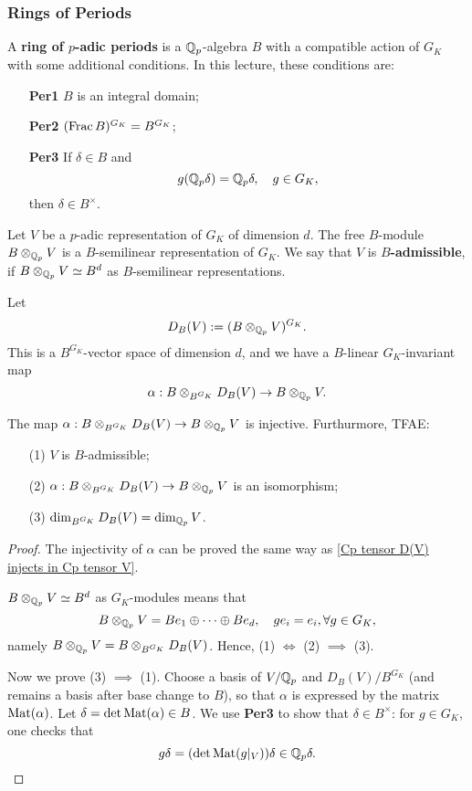 \subsubsection{Rings of Periods}
A \textbf{ring of $p$-adic periods}
is a $\mathbb{Q}_p$-algebra $B$ with a compatible action of $G_K$ with some additional conditions.
In this lecture, these conditions are:
\begin{enumerate}
\item [\textbf{Per1}] $B$ is an integral domain;
\item [\textbf{Per2}] $(\operatorname{Frac} B)^{G_K} = B^{G_K}$;
\item [\textbf{Per3}] If $\delta\in B$ and \[g(\mathbb{Q}_p\delta) = \mathbb{Q}_p\delta, \quad g\in G_K,\]
then $\delta\in B^\times$.
\end{enumerate}

Let $V$ be a $p$-adic representation of $G_K$ of dimension $d$.
The free $B$-module $B\otimes_{\mathbb{Q}_p} V$ is a $B$-semilinear representation of $G_K$.
We say that $V$ is \textbf{$B$-admissible},
if $B\otimes_{\mathbb{Q}_p} V\simeq B^d$ as $B$-semilinear representations.

Let \[D_B(V) := (B\otimes_{\mathbb{Q}_p}V)^{G_K}.\]
This is a $B^{G_K}$-vector space of dimension $d$,
and we have a $B$-linear $G_K$-invariant map \[\alpha : B\otimes_{B^{G_K}} D_B(V)\to B\otimes_{\mathbb{Q}_p}V.\]

\begin{proposition}
    The map $\alpha : B\otimes_{B^{G_K}} D_B(V)\to B\otimes_{\mathbb{Q}_p}V$ is injective.
    Furthurmore, TFAE:\begin{enumerate}
    \item [(1)] $V$ is $B$-admissible;
    \item [(2)] $\alpha : B\otimes_{B^{G_K}} D_B(V)\to B\otimes_{\mathbb{Q}_p}V$ is an isomorphism;
    \item [(3)] $\dim_{B^{G_K}} D_B(V) = \dim_{\mathbb{Q}_p}V$.
    \end{enumerate}
\end{proposition}
\begin{proof}
    The injectivity of $\alpha$ can be proved the same way as \cref{Cp tensor D(V) injects in Cp tensor V}.

    $B\otimes_{\mathbb{Q}_p}V\simeq B^d$ as $G_K$-modules
    means that \[B\otimes_{\mathbb{Q}_p}V = Be_1\oplus\cdots\oplus Be_d,\quad ge_i = e_i,\forall g\in G_K,\]
    namely $B\otimes_{\mathbb{Q}_p}V = B\otimes_{B^{G_K}} D_B(V)$. Hence, (1) $\iff$ (2) $\implies$ (3).
    
    Now we prove (3) $\implies$ (1).
    Choose a basis of $V/\mathbb{Q}_p$ and $D_B(V)/B^{G_K}$ (and remains a basis after base change to $B$),
    so that $\alpha$ is expressed by the matrix $\operatorname{Mat}(\alpha)$.
    Let $\delta = \det \operatorname{Mat}(\alpha)\in B$.
    We use \textbf{Per3} to show that $\delta\in B^\times$: for $g\in G_K$, one checks that
    \[g\delta = (\det\operatorname{Mat}(g|_V))\delta\in\mathbb{Q}_p\delta.
    \qedhere
    \]
\end{proof}

